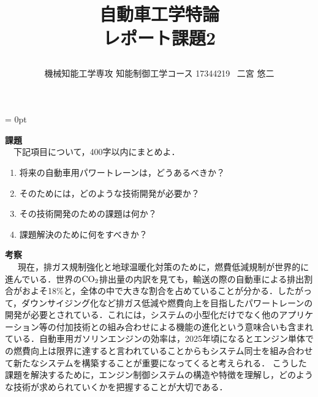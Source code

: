 \documentclass[a4paper,11pt]{jarticle}
\title{\vspace{-20truemm}
{\normalsize \rightline{平成29年\ 11月\ 9日}}
{\large 自動車工学特論\\}
レポート課題2\\
\date{}
\vspace{-2truemm}}
\author{機械知能工学専攻 知能制御工学コース \hspace{3mm} 17344219 \ 二宮 悠二}
\begin{document}
\parindent = 0pt %
\titlepage
\maketitle
{\Large{\bf 課題}}
\vspace{2mm}\\
\ \ 下記項目について，400字以内にまとめよ．
\begin{enumerate}
 \setlength{\leftskip}{3.0cm}
 \item 将来の自動車用パワートレーンは，どうあるべきか？
 \item そのためには，どのような技術開発が必要か？
 \item その技術開発のための課題は何か？
 \item 課題解決のために何をすべきか？
\end{enumerate}
{\Large{\bf 考察}}
\vspace{2mm}\\
\ \ \ 現在，排ガス規制強化と地球温暖化対策のために，燃費低減規制が世界的に進んでいる．世界の$ {\rm CO}_2 $排出量の内訳を見ても，輸送の際の自動車による排出割合がおよそ18\%と，全体の中で大きな割合を占めていることが分かる．したがって，ダウンサイジング化など排ガス低減や燃費向上を目指したパワートレーンの開発が必要とされている．これには，システムの小型化だけでなく他のアプリケーション等の付加技術との組み合わせによる機能の進化という意味合いも含まれている．自動車用ガソリンエンジンの効率は，2025年頃になるとエンジン単体での燃費向上は限界に達すると言われていることからもシステム同士を組み合わせて新たなシステムを構築することが重要になってくると考えられる．
こうした課題を解決するために，エンジン制御システムの構造や特徴を理解し，どのような技術が求められていくかを把握することが大切である．
\end{document}
